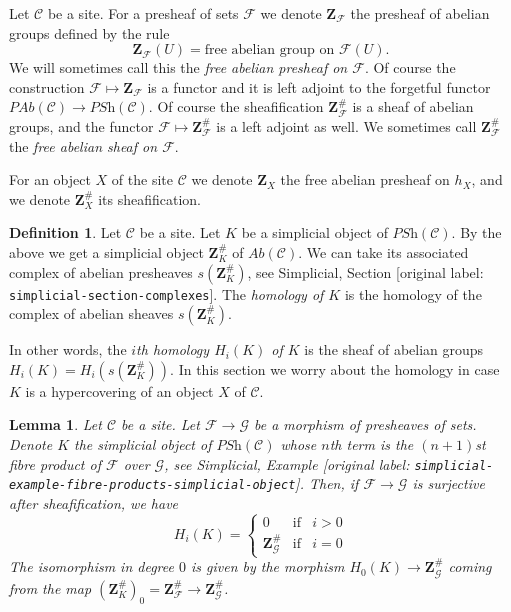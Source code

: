\documentclass[10pt,a4paper]{article}
\theoremstyle{plain}
\newtheorem{lemma}[subsection]{Lemma}
\theoremstyle{definition}
\newtheorem{definition}[subsection]{Definition}
\theoremstyle{remark}
\numberwithin{equation}{subsection}
\begin{document}
\noindent
Let $\mathcal{C}$ be a site.
For a presheaf of sets $\mathcal{F}$ we denote $\mathbf{Z}_\mathcal{F}$
the presheaf of abelian groups defined by the rule
$$
\mathbf{Z}_\mathcal{F}(U) = \text{free abelian group on }\mathcal{F}(U).
$$
We will sometimes call this the {\it free abelian presheaf on $\mathcal{F}$}.
Of course the construction $\mathcal{F} \mapsto \mathbf{Z}_\mathcal{F}$
is a functor and it is left adjoint to the forgetful functor
$\textit{PAb}(\mathcal{C}) \to \textit{PSh}(\mathcal{C})$.
Of course the sheafification $\mathbf{Z}_\mathcal{F}^\#$ is
a sheaf of abelian groups, and the functor
$\mathcal{F} \mapsto \mathbf{Z}_\mathcal{F}^\#$ is a
left adjoint as well. We sometimes call $\mathbf{Z}_\mathcal{F}^\#$
the {\it free abelian sheaf on $\mathcal{F}$}.

\medskip\noindent
For an object $X$ of the site $\mathcal{C}$ we denote
$\mathbf{Z}_X$ the free abelian presheaf on $h_X$, and
we denote $\mathbf{Z}_X^\#$ its sheafification.

\begin{definition}
\label{definition-homology}
Let $\mathcal{C}$ be a site.
Let $K$ be a simplicial object of $\textit{PSh}(\mathcal{C})$.
By the above we get a simplicial object $\mathbf{Z}_K^\#$ of
$\textit{Ab}(\mathcal{C})$. We can take its associated
complex of abelian presheaves $s(\mathbf{Z}_K^\#)$, see
Simplicial, Section \textnormal{[original label: \nolinkurl{simplicial-section-complexes}]}.
The {\it homology of $K$} is the homology of the
complex of abelian sheaves $s(\mathbf{Z}_K^\#)$.
\end{definition}

\noindent
In other words, the {\it $i$th homology $H_i(K)$ of $K$}
is the sheaf of abelian groups $H_i(K) = H_i(s(\mathbf{Z}_K^\#))$.
In this section we worry about the homology in case $K$
is a hypercovering of an object $X$ of $\mathcal{C}$.

\begin{lemma}
\label{lemma-compare-cosk0}
Let $\mathcal{C}$ be a site.
Let $\mathcal{F} \to \mathcal{G}$ be a morphism
of presheaves of sets. Denote $K$ the simplicial
object of $\textit{PSh}(\mathcal{C})$ whose $n$th
term is the $(n + 1)$st fibre product of $\mathcal{F}$
over $\mathcal{G}$, see
Simplicial, Example \textnormal{[original label: \nolinkurl{simplicial-example-fibre-products-simplicial-object}]}.
Then, if $\mathcal{F} \to \mathcal{G}$ is surjective after
sheafification, we have
$$
H_i(K) =
\left\{
\begin{matrix}
0 & \text{if} & i > 0\\
\mathbf{Z}_\mathcal{G}^\# & \text{if} & i = 0
\end{matrix}
\right.
$$
The isomorphism in degree $0$ is given by the
morphism $H_0(K) \to \mathbf{Z}_\mathcal{G}^\#$
coming from the map $(\mathbf{Z}_K^\#)_0 =
\mathbf{Z}_\mathcal{F}^\# \to \mathbf{Z}_\mathcal{G}^\#$.
\end{lemma}
\end{document}
